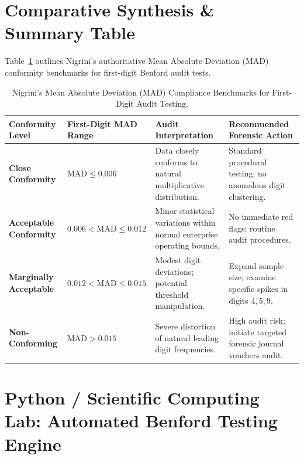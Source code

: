 \section{Comparative Synthesis \& Summary Table}

Table~\ref{tab:comparison_benford_mad} outlines Nigrini's authoritative Mean Absolute Deviation (MAD) conformity benchmarks for first-digit Benford audit tests.

\begin{table}[htbp]
\centering
\small
\begin{tabularx}{\textwidth}{llXX}
\toprule
\textbf{Conformity Level} & \textbf{First-Digit MAD Range} & \textbf{Audit Interpretation} & \textbf{Recommended Forensic Action} \\
\midrule
\textbf{Close Conformity} & $\text{MAD} \le 0.006$ & Data closely conforms to natural multiplicative distribution. & Standard procedural testing; no anomalous digit clustering. \\
\addlinespace
\textbf{Acceptable Conformity} & $0.006 < \text{MAD} \le 0.012$ & Minor statistical variations within normal enterprise operating bounds. & No immediate red flags; routine audit procedures. \\
\addlinespace
\textbf{Marginally Acceptable} & $0.012 < \text{MAD} \le 0.015$ & Modest digit deviations; potential threshold manipulation. & Expand sample size; examine specific spikes in digits $4, 5, 9$. \\
\addlinespace
\textbf{Non-Conforming} & $\text{MAD} > 0.015$ & Severe distortion of natural leading digit frequencies. & High audit risk; initiate targeted forensic journal vouchers audit. \\
\bottomrule
\end{tabularx}
\caption{Nigrini's Mean Absolute Deviation (MAD) Compliance Benchmarks for First-Digit Audit Testing.}
\label{tab:comparison_benford_mad}
\end{table}

\section{Python / Scientific Computing Lab: Automated Benford Testing Engine}

